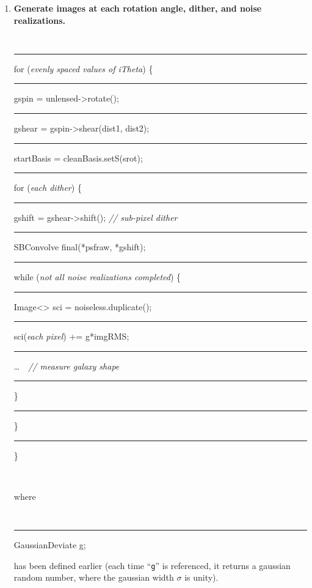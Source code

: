 \documentclass[useAMS,usenatbib,usegraphicx]{mn2e}
\begin{document}
\begin{enumerate}
\item {\bf Generate images at each rotation angle, dither, and noise realizations.} \\
\begin{boxit}
  {\tt 
   \rule{0.1in}{0in} for ({\it evenly spaced values of iTheta}) \{\\ 
   \rule{0.22in}{0in}   gspin = unlensed->rotate(); \\ 
   \rule{0.22in}{0in}   gshear = gspin->shear(dist1, dist2); \\ 
   \rule{0.22in}{0in}   startBasis = cleanBasis.setS(srot); \\ 
   \rule{0.22in}{0in}   for ({\it each dither}) \{ \\ 
   \rule{0.34in}{0in}     gshift = gshear->shift(); {\it // sub-pixel dither} \\ 
   \rule{0.34in}{0in}     SBConvolve final(*psfraw, *gshift); \\
   \rule{0.34in}{0in}     while ({\it not all noise realizations completed}) \{ \\
   \rule{0.46in}{0in}        Image<> sci = noiseless.duplicate(); \\
   \rule{0.46in}{0in}        sci({\it each pixel}) += g*imgRMS;  \\
   \rule{0.46in}{0in}        \ldots \ \ {\it // measure galaxy shape} \\
   \rule{0.34in}{0in}     \} \\ 
   \rule{0.22in}{0in}   \} \\
   \rule{0.1in}{0in} \} } \\
\end{boxit}
where \\
\begin{boxit}
  {\tt 
   \rule{0.1in}{0in} GaussianDeviate g; %
  }
\end{boxit}
has been defined earlier (each time ``{\tt g}'' is referenced, it returns a gaussian
random number, where the gaussian width $\sigma$ is unity). \\


\end{enumerate}
\end{document}
